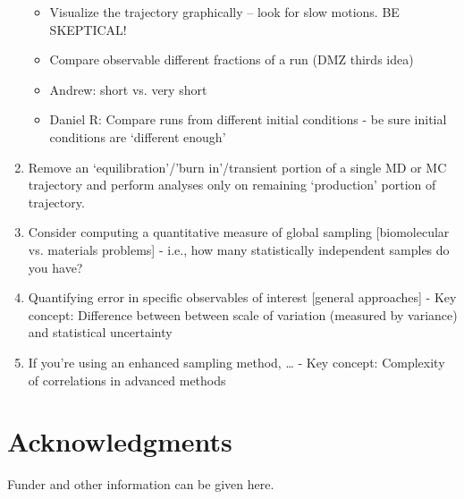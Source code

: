 \documentclass[9pt]{livecoms}
\begin{document}
\begin{enumerate}
\begin{itemize}
    \item Visualize the trajectory graphically -- look for slow motions.  BE SKEPTICAL!
    \item Compare observable different fractions of a run (DMZ thirds idea)
    \item Andrew: short vs. very short
    \item Daniel R: Compare runs from different initial conditions - be sure initial conditions are ‘different enough’
    \end{itemize}
\item
 Remove an ‘equilibration’/’burn in’/transient portion of a single MD or MC trajectory and perform analyses only on remaining ‘production’ portion of trajectory.
\item
 Consider computing a quantitative measure of global sampling [biomolecular vs. materials problems] - i.e., how many statistically independent samples do you have?
\item
 Quantifying error in specific observables of interest [general approaches]
    - Key concept: Difference between between scale of variation (measured by variance) and statistical uncertainty
\item
 If you’re using an enhanced sampling method, …
    - Key concept: Complexity of correlations in advanced methods
\end{enumerate}









\section{Acknowledgments}

Funder and other information can be given here.


%
\end{document}
